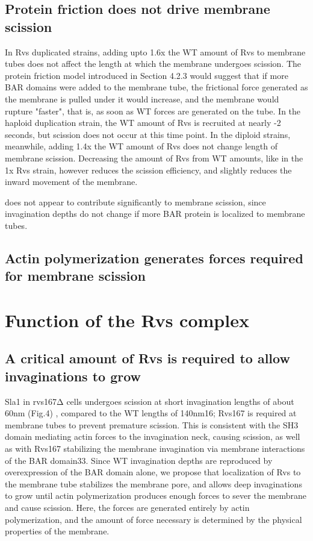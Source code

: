 \subsection{Protein friction does not drive membrane scission}
In Rvs duplicated strains, adding upto 1.6x the WT amount of Rvs to membrane tubes does not affect the length at which the membrane undergoes scission. The protein friction model introduced in Section 4.2.3 would suggest that if more BAR domains were added to the membrane tube, the frictional force generated as the membrane is pulled under it would increase, and the membrane would rupture "faster", that is, as soon as WT forces are generated on the tube. In the haploid duplication strain, the WT amount of Rvs is recruited at nearly -2 seconds, but scission does not occur at this time point. In the diploid strains, meanwhile, adding 1.4x the WT amount of Rvs does not change length of membrane scission. Decreasing the amount of Rvs from WT amounts, like in the 1x Rvs strain, however reduces the scission efficiency, and slightly reduces the inward movement of the membrane. 

does not appear to contribute significantly to membrane scission, since invagination depths do not change if more BAR protein is localized to membrane tubes. 

\subsection{ Actin polymerization generates forces required for membrane scission}

\section{Function of the Rvs complex}





\subsection{A critical amount of Rvs is required to allow invaginations to grow}

Sla1 in rvs167Δ cells undergoes scission at short invagination lengths of about 60nm (Fig.4) , compared to the WT lengths of 140nm16; Rvs167 is required at membrane tubes to prevent premature scission. This is consistent with the SH3 domain mediating actin forces to the invagination neck, causing scission, as well as with Rvs167 stabilizing the membrane invagination via membrane interactions of the BAR domain33. Since WT invagination depths are reproduced by overexpression of the BAR domain alone, we propose that localization of Rvs to the membrane tube stabilizes the membrane pore, and allows deep invaginations to grow until actin polymerization produces enough forces to sever the membrane and cause scission. Here, the forces are generated entirely by actin polymerization, and the amount of force necessary is determined by the physical properties of the membrane.

